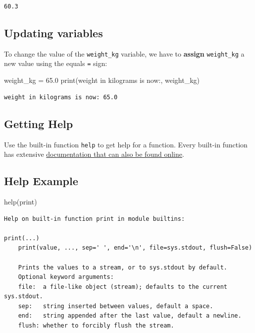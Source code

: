 \documentclass[
  letterpaper,
  DIV=11,
  numbers=noendperiod]{scrartcl}
\newenvironment{Shaded}{\begin{snugshade}}{\end{snugshade}}
\newcommand{\BuiltInTok}[1]{\textcolor[rgb]{0.00,0.23,0.31}{#1}}
\newcommand{\FloatTok}[1]{\textcolor[rgb]{0.68,0.00,0.00}{#1}}
\newcommand{\NormalTok}[1]{\textcolor[rgb]{0.00,0.23,0.31}{#1}}
\newcommand{\OperatorTok}[1]{\textcolor[rgb]{0.37,0.37,0.37}{#1}}
\newcommand{\StringTok}[1]{\textcolor[rgb]{0.13,0.47,0.30}{#1}}
\begin{document}
\begin{verbatim}
60.3
\end{verbatim}

\subsection{Updating variables}\label{updating-variables}

To change the value of the \texttt{weight\_kg} variable, we have to
\textbf{assign} \texttt{weight\_kg} a new value using the equals
\texttt{=} sign:

\begin{Shaded}
\begin{Highlighting}[]
\NormalTok{weight\_kg }\OperatorTok{=} \FloatTok{65.0}
\BuiltInTok{print}\NormalTok{(}\StringTok{\textquotesingle{}weight in kilograms is now:\textquotesingle{}}\NormalTok{, weight\_kg)}
\end{Highlighting}
\end{Shaded}

\begin{verbatim}
weight in kilograms is now: 65.0
\end{verbatim}

\subsection{Getting Help}\label{getting-help}

Use the built-in function \texttt{help} to get help for a function.
Every built-in function has extensive
\href{https://docs.python.org/3/library/index.html}{documentation that
can also be found online}.

\subsection{Help Example}\label{help-example}

\begin{Shaded}
\begin{Highlighting}[]
\BuiltInTok{help}\NormalTok{(}\BuiltInTok{print}\NormalTok{)}
\end{Highlighting}
\end{Shaded}

\begin{verbatim}
Help on built-in function print in module builtins:

print(...)
    print(value, ..., sep=' ', end='\n', file=sys.stdout, flush=False)
    
    Prints the values to a stream, or to sys.stdout by default.
    Optional keyword arguments:
    file:  a file-like object (stream); defaults to the current sys.stdout.
    sep:   string inserted between values, default a space.
    end:   string appended after the last value, default a newline.
    flush: whether to forcibly flush the stream.
\end{verbatim}
\end{document}
